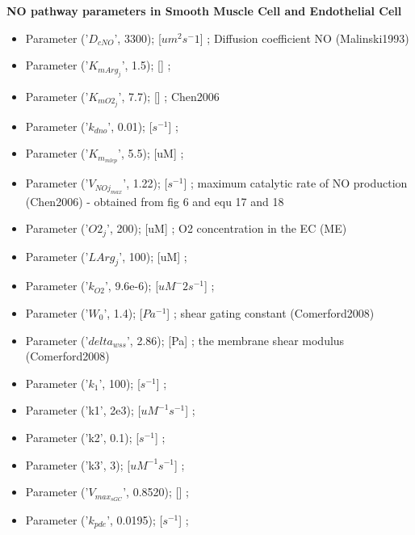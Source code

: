 \documentclass[fleqn]{report}
\numberwithin{equation}{section}
\numberwithin{equation}{section}
\begin{document}
\textbf{NO pathway parameters in Smooth Muscle Cell and Endothelial Cell}
\begin{itemize}
    \item  Parameter   ('$D_{cNO}$', 3300);  [$um^2 s^-1$] ; Diffusion coefficient NO (Malinski1993)\\
    \item  Parameter   ('$K_{mArg_{j}}$', 1.5);  [] ;\\
    \item  Parameter   ('$K_{mO2_{j}}$', 7.7);  [] ; Chen2006\\
    \item  Parameter   ('$k_{dno}$', 0.01);  [$s^{-1}$] ;\\
    \item  Parameter   ('$K_{m_{mlcp}}$', 5.5);  [uM] ;\\
    \item  Parameter   ('$V_{NOj_{max}}$', 1.22);  [$s^{-1}$] ; maximum catalytic rate of NO production (Chen2006) - obtained from fig 6 and equ 17 and 18\\
    \item  Parameter   ('$O2_j$', 200);  [uM] ; O2 concentration in the EC (ME)\\
    \item  Parameter   ('$LArg_j$', 100);  [uM] ;\\
    \item  Parameter   ('$k_{O2}$', 9.6e-6);  [$uM^-2 s^{-1}$] ;\\
    \item  Parameter   ('$W_0$', 1.4);  [$Pa^{-1}$] ; shear gating constant (Comerford2008)\\
    \item  Parameter   ('$delta_{wss}$', 2.86);  [Pa] ; the membrane shear modulus (Comerford2008)\\
    \item  Parameter   ('$k_1$', 100);  [$s^{-1}$] ;\\
    \item  Parameter   ('k1', 2e3); [$uM^{-1} s^{-1}$] ;\\
    \item  Parameter   ('k2', 0.1);  [$s^{-1}$] ;\\
    \item  Parameter   ('k3', 3);  [$uM^{-1} s^{-1}$] ;\\
    \item  Parameter   ('$V_{max_{sGC}}$', 0.8520);  [] ;\\
    \item  Parameter   ('$k_{pde}$', 0.0195);  [$s^{-1}$] ;\\

\end{itemize}
\end{document}
